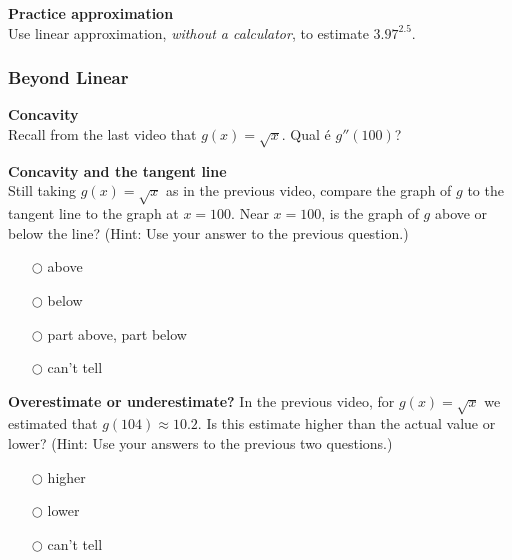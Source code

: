 \documentclass[pdftex, brazil, 12pt, twoside]{article}
\begin{document}
\begin{exercise}
  \textbf{Practice approximation}\\%
  Use linear approximation, \emph{without a calculator}, to estimate $3.97^{2.5}$.
\end{exercise}

\subsubsection{Beyond Linear}
\label{u2-linear-beyond-linear}

\begin{exercise}
  \textbf{Concavity}\\%
  Recall from the last video that $g(x) = \sqrt{x}$. Qual é $g''(100)$?
\end{exercise}

\begin{exercise}
  \textbf{Concavity and the tangent line}\\%
  Still taking $g(x)=\sqrt{x}$ as in the previous video, compare the graph of $g$
  to the tangent line to the graph at $x=100$. Near $x=100$, is the graph of $g$
  above or below the line? (Hint: Use your answer to the previous question.)
  \begin{itemize}[noitemsep]
  \item[$\bigcirc$] above
  \item[$\bigcirc$] below
  \item[$\bigcirc$] part above, part below
  \item[$\bigcirc$] can't tell
  \end{itemize}
\end{exercise}

\begin{exercise}
  \textbf{Overestimate or underestimate?}
  In the previous video, for $g(x) = \sqrt{x}$ we estimated that $g(104) \approx 10.2$.
  Is this estimate higher than the actual value or lower? (Hint: Use your answers to
  the previous two questions.)
  \begin{itemize}[noitemsep]
  \item[$\bigcirc$] higher
  \item[$\bigcirc$] lower
  \item[$\bigcirc$] can't tell
  \end{itemize}
\end{exercise}
\end{document}
